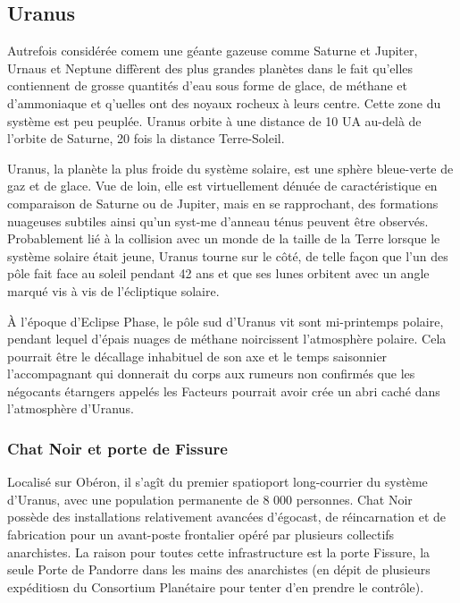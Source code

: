                                                                      \subsection{Uranus} \label{sec:uranus} 

                                                                     Autrefois considérée comem une géante gazeuse comme Saturne et Jupiter, Urnaus et Neptune diffèrent des plus grandes planètes dans le fait qu'elles contiennent de grosse quantités d'eau sous forme de glace, de méthane et d'ammoniaque et q'uelles ont des noyaux rocheux à leurs centre. Cette zone du système est peu peuplée. Uranus orbite à une distance de 10 UA au-delà de l'orbite de Saturne, 20 fois la distance Terre-Soleil. 

                                                                     Uranus, la planète la plus froide du système solaire, est une sphère bleue-verte de gaz et de glace. Vue de loin, elle est virtuellement dénuée de caractéristique en comparaison de Saturne ou de Jupiter, mais en se rapprochant, des formations nuageuses subtiles ainsi qu'un syst-me d'anneau ténus peuvent être observés. Probablement lié à la collision avec un monde de la taille de la Terre lorsque le système solaire était jeune, Uranus tourne sur le côté, de telle façon que l'un des pôle fait face au soleil pendant 42 ans et que ses lunes orbitent avec un angle marqué vis à vis de l'écliptique solaire. 

                                                                     À l'époque d'Eclipse Phase, le pôle sud d'Uranus vit sont mi-printemps polaire, pendant lequel d'épais nuages de méthane noircissent l'atmosphère polaire. Cela pourrait être le décallage inhabituel de son axe et le temps saisonnier l'accompagnant qui donnerait du corps aux rumeurs non confirmés que les négocants étarngers appelés les Facteurs pourrait avoir crée un abri caché dans l'atmosphère d'Uranus. 

                                                                     \subsubsection{Chat Noir et porte de Fissure} \label{sec:chat-noir-fissure} 

                                                                     Localisé sur Obéron, il s'agît du premier spatioport long-courrier du système d'Uranus, avec une population permanente de 8 000 personnes. Chat Noir possède des installations relativement avancées d'égocast, de réincarnation et de fabrication pour un avant-poste frontalier opéré par plusieurs collectifs anarchistes. La raison pour toutes cette infrastructure est la porte Fissure, la seule Porte de Pandorre dans les mains des anarchistes (en dépit de plusieurs expéditiosn du Consortium Planétaire pour tenter d'en prendre le contrôle). 

